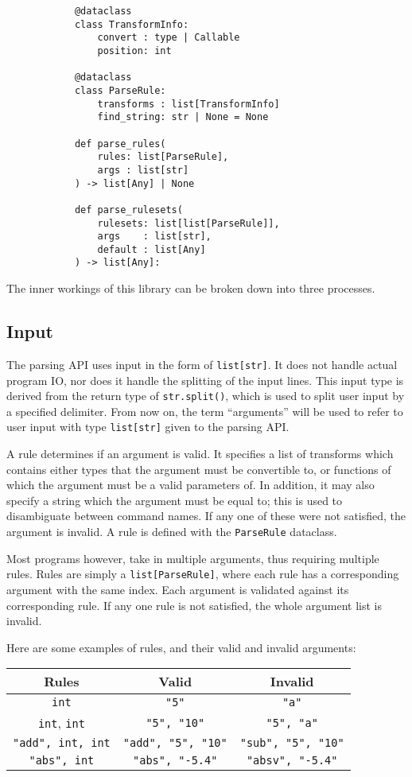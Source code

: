 \documentclass{article}
\begin{document}
		\begin{verbatim}
			@dataclass
			class TransformInfo:
				convert : type | Callable
				position: int

			@dataclass
			class ParseRule:
				transforms : list[TransformInfo]
				find_string: str | None = None

			def parse_rules(
				rules: list[ParseRule],
				args : list[str]
			) -> list[Any] | None

			def parse_rulesets(
				rulesets: list[list[ParseRule]],
				args    : list[str],
				default : list[Any]
			) -> list[Any]:
		\end{verbatim}

		The inner workings of this library can be broken down into three processes.

		\subsection{Input}
			The parsing API uses input in the form of \verb|list[str]|. It does not handle
			actual program IO, nor does it handle the splitting of the input lines. This
			input type is derived from the return type of \verb|str.split()|, which is
			used to split user input by a specified delimiter. From now on, the term
			``arguments'' will be used to refer to user input with type \verb|list[str]|
			given to the parsing API\@.

			A rule determines if an argument is valid. It specifies a list of transforms which
			contains either types that the argument must be convertible to, or functions of
			which the argument must be a valid parameters of. In addition, it may also specify
			a string which the argument must be equal to; this is used to disambiguate between
			command names. If any one of these were not satisfied, the argument is invalid. A
			rule is defined with the \verb|ParseRule| dataclass.

			Most programs however, take in multiple arguments, thus requiring multiple rules.
			Rules are simply a \verb|list[ParseRule]|, where each rule has a corresponding
			argument with the same index. Each argument is validated against its corresponding
			rule. If any one rule is not satisfied, the whole argument list is invalid.

			Here are some examples of rules, and their valid and invalid arguments:

			\begin{center}
				\begin{tabular}{|c|c|c|}
					\hline
					Rules & Valid & Invalid
					\\ \hline
						\verb|int| &
						\verb|"5"| &
						\verb|"a"|
					\\ \hline
						\verb|int|, \verb|int| &
						\verb|"5", "10"| &
						\verb|"5", "a"|
					\\ \hline
						\verb|"add", int, int| &
						\verb|"add", "5", "10"| &
						\verb|"sub", "5", "10"|
					\\ \hline
						\verb|"abs", int| &
						\verb|"abs", "-5.4"| &
						\verb|"absv", "-5.4"|
					\\\hline
				\end{tabular}
			\end{center}
\end{document}
